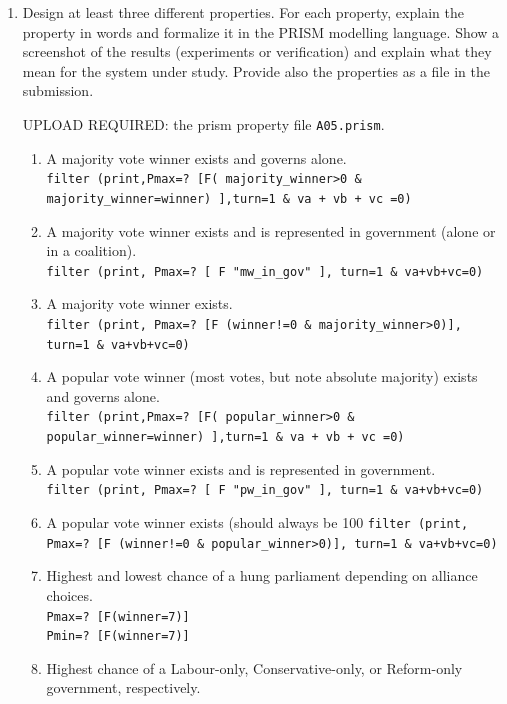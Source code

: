 \documentclass[12pt,a4paper]{article}
\begin{document}
\begin{enumerate}
\color{black}
\fi
%
\item Design at least three different properties. For each property, explain the property in words and formalize it in the PRISM modelling language. Show a screenshot of the results (experiments or verification) and explain what they mean for the system under study. Provide also the properties as a file in the submission.
\color{red} \par UPLOAD REQUIRED: the prism property file \texttt{A05.prism}.
\color{black}
%
\ifwithanswers
\color{blue}
\par
\begin{enumerate}
    \item A majority vote winner exists and governs alone. \\
    \texttt{filter (print,Pmax=? [F( majority\_winner>0 \& majority\_winner=winner) ],turn=1 \& va + vb + vc =0)}
    \item A majority vote winner exists and is represented in government (alone or in a coalition). \\
    \texttt{filter (print, Pmax=? [ F "mw\_in\_gov" ], turn=1 \& va+vb+vc=0)}
    \item A majority vote winner exists. \\
    \texttt{filter (print, Pmax=? [F (winner!=0 \& majority\_winner>0)], turn=1 \& va+vb+vc=0)}
    \item A popular vote winner (most votes, but note absolute majority) exists and governs alone. \\
    \texttt{filter (print,Pmax=? [F( popular\_winner>0 \& popular\_winner=winner) ],turn=1 \& va + vb + vc =0)}
    \item A popular vote winner exists and is represented in government. \\
    \texttt{filter (print, Pmax=? [ F "pw\_in\_gov" ], turn=1 \& va+vb+vc=0)}
    \item A popular vote winner exists (should always be 100%
    \texttt{filter (print, Pmax=? [F (winner!=0 \& popular\_winner>0)], turn=1 \& va+vb+vc=0)}
    \item Highest and lowest chance of a hung parliament depending on alliance choices. \\
    \texttt{Pmax=? [F(winner=7)]} \\
    \texttt{Pmin=? [F(winner=7)]}
    \item Highest chance of a Labour-only, Conservative-only, or Reform-only government, respectively. \\

\end{enumerate}
\end{enumerate}
\end{document}
